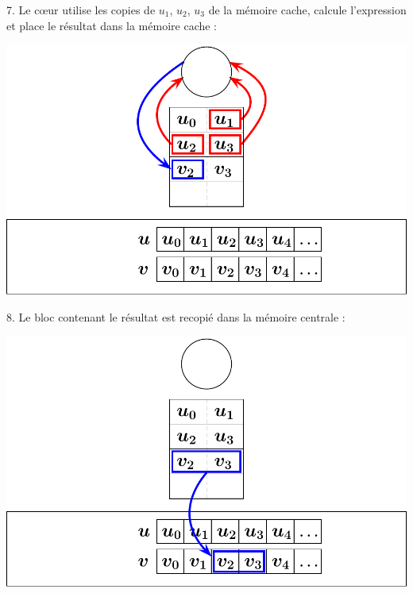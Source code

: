 \documentclass{beamer}
\begin{document}
\begin{frame}
	\parbox[t][1cm]{10cm}{7. Le c\oe ur utilise les copies de $u_1$, $u_2$, $u_3$ de la mémoire cache, calcule l'expression et place le résultat dans la mémoire cache :}
	\begin{center}
		\includegraphics[scale=0.6]{../../Images/sequentiel6}
	\end{center}
\end{frame}
\begin{frame}
	\parbox[t][1cm]{10cm}{8. Le bloc contenant le résultat est recopié dans la mémoire centrale :}
	\begin{center}
		\includegraphics[scale=0.6]{../../Images/sequentiel7}
	\end{center}
\end{frame}
\end{document}
